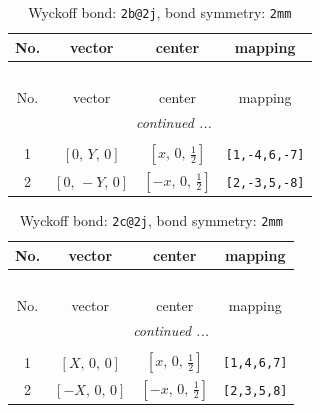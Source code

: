 \documentclass[fleqn,8pt]{jsarticle}
\begin{document}
\renewcommand{\arraystretch}{1.2}
\begin{longtable}{cccc}
\caption{Wyckoff bond: {\tt 2b@2j}, bond symmetry: {\tt 2mm}}
 \\
 \hline \hline
No. & vector & center & mapping \\ \hline \endfirsthead

\multicolumn{3}{l}{\tablename\ \thetable{}} \\
 \hline \hline
No. & vector & center & mapping \\ \hline \endhead

 \hline \hline
\multicolumn{3}{r}{\footnotesize\it continued ...} \\ \endfoot

 \hline \hline
\multicolumn{3}{r}{} \\ \endlastfoot

1 & $\left[ 0,\, Y,\, 0 \right]$ & $\left[ x,\, 0,\, \frac{1}{2} \right]$ & {\tt [1,-4,6,-7]} \\ \hline
2 & $\left[ 0,\, - Y,\, 0 \right]$ & $\left[ - x,\, 0,\, \frac{1}{2} \right]$ & {\tt [2,-3,5,-8]} \\
\end{longtable}
\renewcommand{\arraystretch}{1.2}
\begin{longtable}{cccc}
\caption{Wyckoff bond: {\tt 2c@2j}, bond symmetry: {\tt 2mm}}
 \\
 \hline \hline
No. & vector & center & mapping \\ \hline \endfirsthead

\multicolumn{3}{l}{\tablename\ \thetable{}} \\
 \hline \hline
No. & vector & center & mapping \\ \hline \endhead

 \hline \hline
\multicolumn{3}{r}{\footnotesize\it continued ...} \\ \endfoot

 \hline \hline
\multicolumn{3}{r}{} \\ \endlastfoot

1 & $\left[ X,\, 0,\, 0 \right]$ & $\left[ x,\, 0,\, \frac{1}{2} \right]$ & {\tt [1,4,6,7]} \\ \hline
2 & $\left[ - X,\, 0,\, 0 \right]$ & $\left[ - x,\, 0,\, \frac{1}{2} \right]$ & {\tt [2,3,5,8]} \\
\end{longtable}
\renewcommand{\arraystretch}{1.2}
\end{document}
